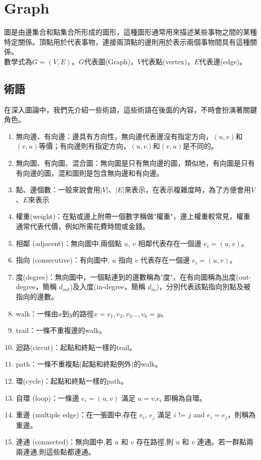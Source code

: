 \section{Graph}
圖是由邊集合和點集合所形成的圖形，這種圖形通常用來描述某些事物之間的某種特定關係。頂點用於代表事物，連接兩頂點的邊則用於表示兩個事物間具有這種關係。\\
數學式為$G=(V,E)$。$G$代表圖(Graph)，$V$代表點(vertex)，$E$代表邊(edge)。
\subsection{術語}
在深入圖論中，我們先介紹一些術語，這些術語在後面的內容，不時會扮演著關鍵角色。
\begin{enumerate}
\item 無向邊、有向邊：邊具有方向性，無向邊代表邊沒有指定方向，$(u,v)$和$(v,u)$等價；有向邊則有指定方向，$(u,v)$和$(v,u)$是不同的。
\item 無向圖、有向圖、混合圖：無向圖是只有無向邊的圖，類似地，有向圖是只有有向邊的圖，混和圖則是包含無向邊和有向邊。
\item 點、邊個數：一般來說會用$|V|$、$|E|$來表示，在表示複雜度時，為了方便會用$V$、$E$來表示
\item 權重(weight)：在點或邊上附帶一個數字稱做"權重"，邊上權重較常見，權重通常代表代價，例如所需花費時間或金錢。
\item 相鄰 (adjacent)：無向圖中,兩個點 $u$, $v$ 相鄰代表存在一個邊 $e_i = (u, v)$。
\item 指向 (consecutive)：有向圖中, $u$ 指向 $v$ 代表存在一個邊 $e_i = (u, v)$。
\item 度(degree)：無向圖中，一個點連到的邊數稱為"度"，在有向圖稱為出度(out-degree，簡稱 $d_{out}$)及入度(in-degree，簡稱 $d_{in}$)，分別代表該點指向別點及被指向的邊數。
\item walk：一條由$x$到$y$的路徑$x=v_1,v_2,v_3...,v_k=y$。
\item trail：一條不重複邊的walk。
\item 迴路(circut)：起點和終點一樣的trail。
\item path：一條不重複點(起點和終點例外)的walk。
\item 環(cycle)：起點和終點一樣的path。
\item 自環 (loop)：一條邊 $e_i = (u, v)$ 滿足 $u = v$,$e_i$ 即稱為自環。
\item 重邊 (multiple edge)：在一張圖中,存在 $e_i$, $e_j$ 滿足 $i$ != $j$ and $e_i = e_j$，則稱為重邊。
\item 連通 (connected)：無向圖中,若 $u$ 和 $v$ 存在路徑,則 $u$ 和 $v$ 連通。若一群點兩兩連通,則這些點都連通。
\end{enumerate}
